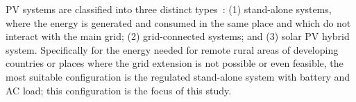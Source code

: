 \documentclass[journal]{IEEEtran}
\begin{document}
PV systems are classified into three distinct types~\cite{Mohanty}: (1) stand-alone systems, where the energy is generated and consumed in the same place and which do not interact with the main grid; (2) grid-connected systems; and (3) solar PV hybrid system. %
%
Specifically for the energy needed for remote rural areas of developing countries or places where the grid extension is not possible or even feasible, 
the most suitable configuration is the regulated stand-alone system with battery and AC load; this configuration is the focus of this study.
\end{document}
